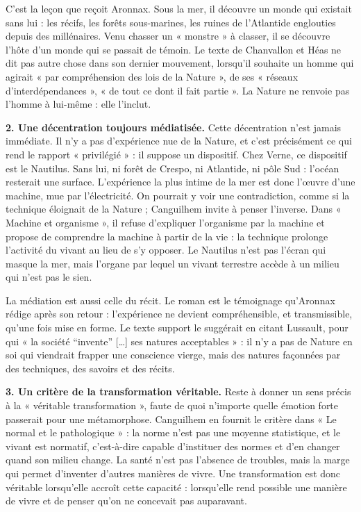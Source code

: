 \documentclass[11pt,a4paper]{article}
\begin{document}
C'est la leçon que reçoit Aronnax. Sous la mer, il découvre un monde qui existait sans lui : les récifs, les forêts sous-marines, les ruines de l'Atlantide englouties depuis des millénaires. Venu chasser un « monstre » à classer, il se découvre l'hôte d'un monde qui se passait de témoin. Le texte de Chanvallon et Héas ne dit pas autre chose dans son dernier mouvement, lorsqu'il souhaite un homme qui agirait « par compréhension des lois de la Nature », de ses « réseaux d'interdépendances », « de tout ce dont il fait partie ». La Nature ne renvoie pas l'homme à lui-même : elle l'inclut.

\textbf{2. Une décentration toujours médiatisée.} Cette décentration n'est jamais immédiate. Il n'y a pas d'expérience nue de la Nature, et c'est précisément ce qui rend le rapport « privilégié » : il suppose un dispositif. Chez Verne, ce dispositif est le Nautilus. Sans lui, ni forêt de Crespo, ni Atlantide, ni pôle Sud : l'océan resterait une surface. L'expérience la plus intime de la mer est donc l'œuvre d'une machine, mue par l'électricité. On pourrait y voir une contradiction, comme si la technique éloignait de la Nature ; Canguilhem invite à penser l'inverse. Dans « Machine et organisme », il refuse d'expliquer l'organisme par la machine et propose de comprendre la machine à partir de la vie : la technique prolonge l'activité du vivant au lieu de s'y opposer. Le Nautilus n'est pas l'écran qui masque la mer, mais l'organe par lequel un vivant terrestre accède à un milieu qui n'est pas le sien.

La médiation est aussi celle du récit. Le roman est le témoignage qu'Aronnax rédige après son retour : l'expérience ne devient compréhensible, et transmissible, qu'une fois mise en forme. Le texte support le suggérait en citant Lussault, pour qui « la société ``invente'' {[}\ldots{]} ses natures acceptables » : il n'y a pas de Nature en soi qui viendrait frapper une conscience vierge, mais des natures façonnées par des techniques, des savoirs et des récits.

\textbf{3. Un critère de la transformation véritable.} Reste à donner un sens précis à la « véritable transformation », faute de quoi n'importe quelle émotion forte passerait pour une métamorphose. Canguilhem en fournit le critère dans « Le normal et le pathologique » : la norme n'est pas une moyenne statistique, et le vivant est normatif, c'est-à-dire capable d'instituer des normes et d'en changer quand son milieu change. La santé n'est pas l'absence de troubles, mais la marge qui permet d'inventer d'autres manières de vivre. Une transformation est donc véritable lorsqu'elle accroît cette capacité : lorsqu'elle rend possible une manière de vivre et de penser qu'on ne concevait pas auparavant.
\end{document}
